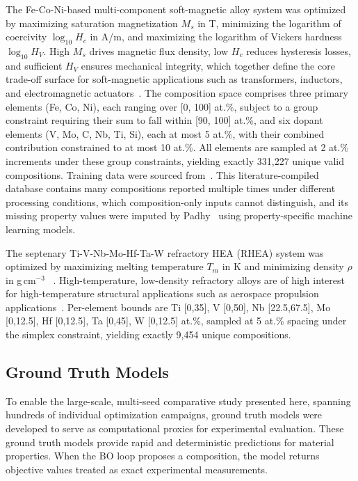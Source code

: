 The Fe-Co-Ni-based multi-component soft-magnetic alloy system was optimized by maximizing saturation magnetization $M_s$ in T, minimizing the logarithm of coercivity $\log_{10} H_c$ in A/m, and maximizing the logarithm of Vickers hardness $\log_{10} H_V$. High $M_s$ drives magnetic flux density, low $H_c$ reduces hysteresis losses, and sufficient $H_V$ ensures mechanical integrity, which together define the core trade-off surface for soft-magnetic applications such as transformers, inductors, and electromagnetic actuators~\cite{padhy2024experimentally}. The composition space comprises three primary elements (Fe, Co, Ni), each ranging over [0, 100] at.\%, subject to a group constraint requiring their sum to fall within [90, 100] at.\%, and six dopant elements (V, Mo, C, Nb, Ti, Si), each at most 5 at.\%, with their combined contribution constrained to at most 10 at.\%. All elements are sampled at 2 at.\% increments under these group constraints, yielding exactly 331,227 unique valid compositions. Training data were sourced from~\cite{padhy2024experimentally}. This literature-compiled database contains many compositions reported multiple times under different processing conditions, which composition-only inputs cannot distinguish, and its missing property values were imputed by Padhy \etal\ using property-specific machine learning models.

\label{sec:mpd-problem}
The septenary Ti-V-Nb-Mo-Hf-Ta-W refractory HEA (RHEA) system was optimized by maximizing melting temperature $T_m$ in K and minimizing density $\rho$ in g\,cm$^{-3}$ ~\cite{hastings2025leveraging}. High-temperature, low-density refractory alloys are of high interest for high-temperature structural applications such as aerospace propulsion applications~\cite{SENKOV20101758, ZHUO20241097}. Per-element bounds are Ti [0,35], V [0,50], Nb [22.5,67.5], Mo [0,12.5], Hf [0,12.5], Ta [0,45], W [0,12.5] at.\%, sampled at 5 at.\% spacing under the simplex constraint, yielding exactly 9,454 unique compositions.


\subsection{Ground Truth Models}
\label{sec:truth-models}

To enable the large-scale, multi-seed comparative study presented here, spanning hundreds of individual optimization campaigns, ground truth models were developed to serve as computational proxies for experimental evaluation. These ground truth models provide rapid and deterministic predictions for material properties. When the BO loop proposes a composition, the model returns objective values treated as exact experimental measurements.

